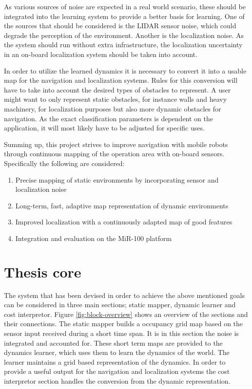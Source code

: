  
As various sources of noise are expected in a real world scenario, these should be integrated into the learning system to provide a better basis for learning. One of the sources that should be considered is the LIDAR sensor noise, which could degrade the perception of the environment. 
Another is the localization noise.
As the system should run without extra infrastructure, the localization uncertainty in an on-board localization system should be taken into account.


In order to utilize the learned dynamics it is necessary to convert it into a usable map for the navigation and localization systems. Rules for this conversion will have to take into account the desired types of obstacles to represent. 
A user might want to only represent static obstacles, for instance walls and heavy machinery, for localization purposes but also more dynamic obstacles for navigation. 
As the exact classification parameters is dependent on the  application, it will most likely have to be adjusted for specific uses. 

Summing up, this project strives to improve navigation with mobile robots through continuous mapping of the operation area with on-board sensors. 
Specifically the following are considered:
\begin{enumerate}
    \item Precise mapping of static environments by incorporating sensor and localization noise
    \item Long-term, fast, adaptive map representation of dynamic environments
    \item Improved localization with a continuously adapted map of good features
    \item Integration and evaluation on the MiR-100 platform
\end{enumerate}

\section{Thesis core}
The system that has been devised in order to achieve the above mentioned goals can be considered in three main sections; static mapper, dynamic learner and cost interpretor. 
Figure \ref{fig:block-overview} shows an overview of the sections and their connections. 
The static mapper builds a occupancy grid map based on the sensor input received during a short time span. It is in this section the noise is integrated  and accounted for. 
These short term maps are provided to the dynamics learner, which uses them to learn the dynamics of the world. 
The learner maintains a grid based representation of the dynamics.  
In order to provide a useful output for the navigation and localization systems the cost interpretor section handles the conversion from the dynamic representation. 

